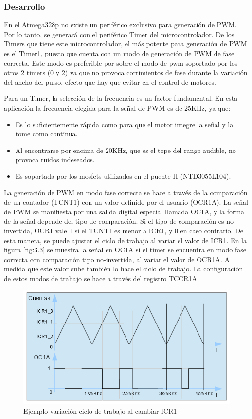 \subsubsection{Desarrollo}
En el Atmega328p no existe un periférico exclusivo para generación de PWM. Por lo tanto, se generará con el periférico Timer del microcontrolador. De los Timers que tiene este microcontrolador, el más potente para generación de PWM es el Timer1, puesto que cuenta con un modo de generación de PWM de fase correcta. Este modo es preferible por sobre el modo de pwm soportado por los otros 2 timers (0 y 2) ya que no provoca corrimientos de fase durante la variación del ancho del pulso, efecto que hay que evitar en el control de motores.

Para un Timer, la selección de la frecuencia es un factor fundamental. En esta aplicación la frecuencia elegida para la señal de PWM es de 25KHz, ya que:
\begin{itemize}
	\item Es lo suficientemente rápida como para que el motor integre la señal y la tome como continua.
	\item Al encontrarse por encima de 20KHz, que es el tope del rango audible, no provoca ruidos indeseados.
	\item Es soportada por los mosfets utilizados en el puente H (NTD3055L104).
\end{itemize}

La generación de PWM en modo fase correcta se hace a través de la comparación de un contador (TCNT1) con un valor definido por el usuario (OCR1A). La señal de PWM se manifiesta por una salida digital especial llamada OC1A, y la forma de la señal depende del tipo de comparación. Si el tipo de comparación es no-invertida, OCR1 vale 1 si el TCNT1 es menor a ICR1, y 0 en caso contrario. De esta manera, se puede ajustar el ciclo de trabajo al variar el valor de ICR1. En la figura \ref{fig:3.3} se muestra la señal en OC1A si el timer se encuentra en modo fase correcta con comparación tipo no-invertida, al variar el valor de OCR1A. A medida que este valor sube también lo hace el ciclo de trabajo. La configuración de estos modos de trabajo se hace a través del registro TCCR1A.

\begin{figure}[!ht]
	\centering
	\includegraphics[width=15cm,scale=1]{resources/3_3-generacionPWM.png}
	\caption{Ejemplo variación ciclo de trabajo al cambiar ICR1}
	\label{fig:\thefigure}
\end{figure}

